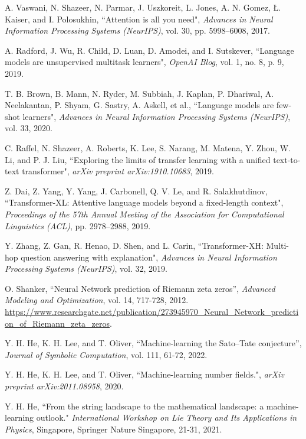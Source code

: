 \documentclass[journal]{IEEEtai}
\begin{document}
\begin{thebibliography}{34}

A. Vaswani, N. Shazeer, N. Parmar, J. Uszkoreit, L. Jones, A. N. Gomez, Ł. Kaiser, and I. Polosukhin, ``Attention is all you need",  \emph{Advances in Neural Information Processing Systems (NeurIPS)}, vol. 30, pp. 5998--6008, 2017.

A. Radford, J. Wu, R. Child, D. Luan, D. Amodei, and I. Sutskever, ``Language models are unsupervised multitask learners", \emph{OpenAI Blog}, vol. 1, no. 8, p. 9, 2019.

T. B. Brown, B. Mann, N. Ryder, M. Subbiah, J. Kaplan, P. Dhariwal, A. Neelakantan, P. Shyam, G. Sastry, A. Askell, et al., ``Language models are few-shot learners",  \emph{Advances in Neural Information Processing Systems (NeurIPS)}, vol. 33, 2020.

C. Raffel, N. Shazeer, A. Roberts, K. Lee, S. Narang, M. Matena, Y. Zhou, W. Li, and P. J. Liu, ``Exploring the limits of transfer learning with a unified text-to-text transformer", \emph{arXiv preprint arXiv:1910.10683}, 2019.

Z. Dai, Z. Yang, Y. Yang, J. Carbonell, Q. V. Le, and R. Salakhutdinov, ``Transformer-XL: Attentive language models beyond a fixed-length context",  \emph{Proceedings of the 57th Annual Meeting of the Association for Computational Linguistics (ACL)}, pp. 2978--2988, 2019.

Y. Zhang, Z. Gan, R. Henao, D. Shen, and L. Carin, ``Transformer-XH: Multi-hop question answering with explanation",  \emph{Advances in Neural Information Processing Systems (NeurIPS)}, vol. 32, 2019.

 O. Shanker, ``Neural Network prediction of Riemann zeta zeros'',
\emph{Advanced Modeling and Optimization}, vol. 14, 717-728, 2012. \url{https://www.researchgate.net/publication/273945970_Neural_Network_prediction_of_Riemann_zeta_zeros}.

 Y. H. He, K. H. Lee, and T. Oliver, ``Machine-learning the Sato–Tate conjecture'', \emph{Journal of Symbolic Computation}, vol. 111, 61-72, 2022.

Y. H. He, K. H. Lee, and T. Oliver, 
``Machine-learning number fields.",
\emph{arXiv preprint arXiv:2011.08958}, 2020.

Y. H. He,
``From the string landscape to the mathematical landscape: a machine-learning outlook."
\emph{International Workshop on Lie Theory and Its Applications in Physics}, Singapore, Springer Nature Singapore, 21-31, 2021.


\end{thebibliography}
\end{document}
